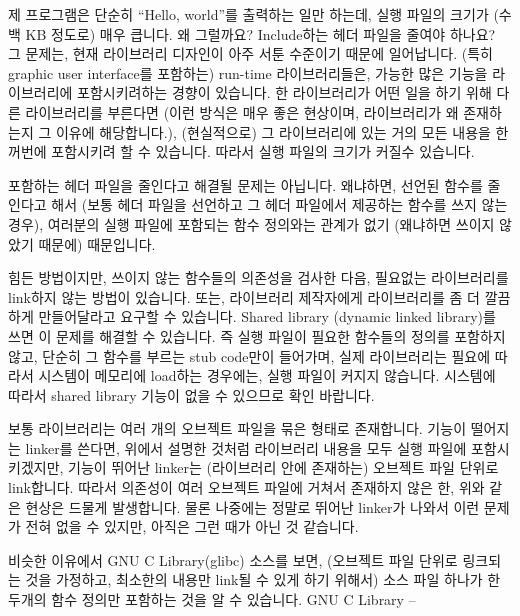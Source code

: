 \begin{faq}
	제 프로그램은 단순히 ``Hello, world''를 출력하는 일만 하는데,
        실행 파일의 크기가 (수백 KB 정도로) 매우 큽니다. 왜 그럴까요?
        Include하는 헤더 파일을 줄여야 하나요?
\A
	그 문제는, 현재 라이브러리 디자인이 아주 서툰 수준이기 때문에
        일어납니다. (특히 graphic user interface를 포함하는) run-time
        라이브러리들은, 가능한 많은 기능을 라이브러리에 포함시키려하는
        경향이 있습니다.  한 라이브러리가 어떤 일을 하기 위해 다른
        라이브러리를 부른다면 (이런 방식은 매우 좋은 현상이며, 라이브러리가
        왜 존재하는지 그 이유에 해당합니다.), (현실적으로) 그 라이브러리에
        있는 거의 모든 내용을 한꺼번에 포함시키려 할 수 있습니다. 따라서
        실행 파일의 크기가 커질수 있습니다.

        포함하는 헤더 파일을 줄인다고 해결될 문제는 아닙니다. 왜냐하면,
        선언된 함수를 줄인다고 해서 (보통 헤더 파일을 선언하고 그 헤더 파일에서
        제공하는 함수를 쓰지 않는 경우), 여러분의 실행 파일에 포함되는 함수
        정의와는 관계가 없기 (왜냐하면 쓰이지 않았기 때문에) 때문입니다.
        
        힘든 방법이지만, 쓰이지 않는 함수들의 의존성을 검사한 다음, 필요없는
        라이브러리를 link하지 않는 방법이 있습니다. 또는, 라이브러리 제작자에게
        라이브러리를 좀 더 깔끔하게 만들어달라고 요구할 수 있습니다.
\T
	Shared library (dynamic linked library)를 쓰면 이 문제를 해결할 수 
        있습니다. 즉 실행 파일이 필요한 함수들의 정의를 포함하지 않고,
        단순히 그 함수를 부르는 stub code만이 들어가며, 실제 라이브러리는
        필요에 따라서 시스템이 메모리에 load하는 경우에는, 실행 파일이
        커지지 않습니다. 시스템에 따라서 shared library 기능이 없을 수 있으므로
        확인 바랍니다.

        보통 라이브러리는 여러 개의 오브젝트 파일을 묶은 형태로 존재합니다.
        기능이 떨어지는 linker를 쓴다면, 위에서 설명한 것처럼 라이브러리 내용을
        모두 실행 파일에 포함시키겠지만, 기능이 뛰어난 linker는 (라이브러리
        안에 존재하는) 오브젝트 파일 단위로 link합니다. 따라서 의존성이 여러
        오브젝트 파일에 거쳐서 존재하지 않은 한, 위와 같은 현상은 드물게
        발생합니다. 물론 나중에는 정말로 뛰어난 linker가 나와서 이런 문제가
        전혀 없을 수 있지만, 아직은 그런 때가 아닌 것 같습니다.

        비슷한 이유에서 GNU C Library(glibc) 소스를 보면, (오브젝트 파일
        단위로 링크되는 것을 가정하고, 최소한의 내용만 link될 수 있게 하기
        위해서)  소스 파일 하나가 한 두개의 함수 정의만 포함하는 것을 알 수
        있습니다.
\R
	GNU C Library -- 
\end{faq}

